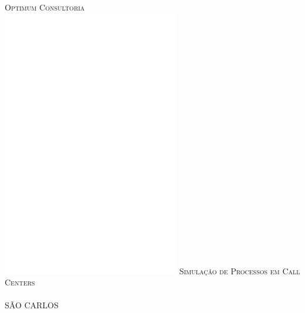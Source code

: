 
\pagecolor{OptimumGray}\afterpage{\nopagecolor}

\begin{titlepage}
\selectfont
\pagecolor{OptimumGray}\afterpage{\nopagecolor}
\center
\color{white}
\vspace*{5px} 
\textsc{\Huge Optimum Consultoria}\\[0.4cm] 
\vfill
\includegraphics[scale = 2.05]{capa/images/Logo_short_transparente_branco.png}
\vfill
\textsc{\LARGE Simulação de Processos em Call Centers} \\[0.5cm]
\textsc{\huge } \\ [0.5cm] 
\vspace*{\fill}
\large{SÃO CARLOS}
\end{titlepage}
\restoregeometry
\newpage%
\newcommand\blankpage{%
    \null
    \thispagestyle{empty}%
    \addtocounter{page}{-1}%
    \newpage}

\afterpage{\blankpage}

